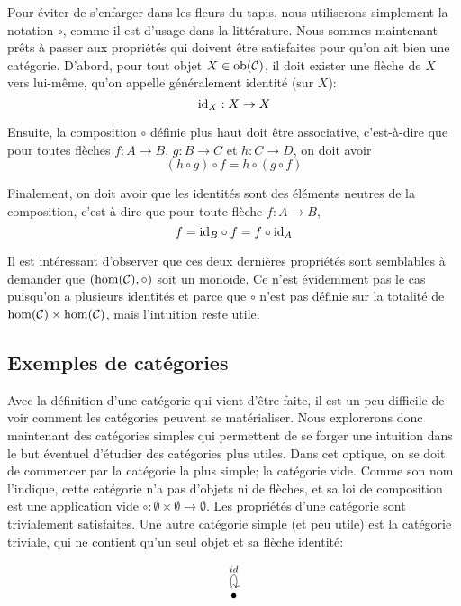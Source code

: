 Pour éviter de s'enfarger dans les fleurs du tapis, nous utiliserons simplement
la notation $\circ$, comme il est d'usage dans la littérature. Nous sommes
maintenant prêts à passer aux propriétés qui doivent être satisfaites pour
qu'on ait bien une catégorie. D'abord, pour tout objet $X \in \mathrm{ob}(\mathcal{C})$, il
doit exister une flèche de $X$ vers lui-même, qu'on appelle généralement
identité (sur $X$):
\[
    \mathrm{id}_X : X \to X
\]

Ensuite, la composition $\circ$ définie plus haut doit être associative,
c'est-à-dire que pour toutes flèches $f : A \to B$, $g : B \to C$ et
$h : C \to D$, on doit avoir
\[
    (h \circ g) \circ f = h \circ (g \circ f)
\]

Finalement, on doit avoir que les identités sont des éléments neutres de la
composition, c'est-à-dire que pour toute flèche $f : A \to B$,
\[
    f = \mathrm{id}_B \circ f = f \circ \mathrm{id}_A
\]

Il est intéressant d'observer que ces deux dernières propriétés sont
semblables à demander que $\left(\hom(\mathcal{C}), \circ\right)$ soit un monoïde.
Ce n'est évidemment pas le cas puisqu'on a plusieurs identités et parce
que $\circ$ n'est pas définie sur la totalité de $\hom(\mathcal{C}) \times \hom(\mathcal{C})$,
mais l'intuition reste utile.


\subsection{Exemples de catégories}
Avec la définition d'une catégorie qui vient d'être faite, il est un peu
difficile de voir comment les catégories peuvent se matérialiser. Nous
explorerons donc maintenant des catégories simples qui permettent de se
forger une intuition dans le but éventuel d'étudier des catégories plus utiles.
Dans cet optique, on se doit de commencer par la catégorie la plus simple;
la catégorie vide. Comme son nom l'indique, cette catégorie n'a pas d'objets
ni de flèches, et sa loi de composition est une application vide
$\circ : \emptyset \times \emptyset \to \emptyset$. Les propriétés d'une
catégorie sont trivialement satisfaites. Une autre catégorie simple (et
peu utile) est la catégorie triviale, qui ne contient qu'un seul objet
et sa flèche identité:

\[
\scalebox{1}{
    \begin{tikzcd}
        \bullet \arrow[loop above, "id"]
    \end{tikzcd}
}
\]

